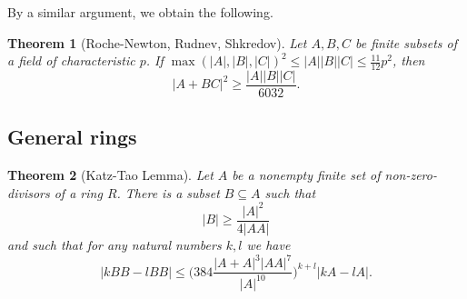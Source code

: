 \documentclass[letterpaper,11pt]{article}
\newtheorem{thm}{Theorem}
\theoremstyle{definition}
\theoremstyle{remark}
\begin{document}
By a similar argument, we obtain the following.

\begin{thm}[Roche-Newton, Rudnev, Shkredov] Let $A,B,C$ be finite subsets of a field of characteristic $p$. If $\max(|A|,|B|,|C|)^2 \le |A||B||C| \le \frac{11}{12}p^2$, then
\[
|A+BC|^2 \ge \frac{|A||B||C|}{6032}.
\]
\end{thm}

\subsection{General rings}

\begin{thm}[Katz-Tao Lemma] Let $A$ be a nonempty finite set of non-zero-divisors of a ring $R$. There is a subset $B \subseteq A$ such that
\[
|B| \ge \frac{|A|^2}{4|AA|}
\]
and such that for any natural numbers $k,l$ we have
\[
|kBB-lBB| \le \bigg(384\frac{|A+A|^3|AA|^7}{|A|^{10}}\bigg)^{k+l}|kA-lA|.
\]
\end{thm}
\end{document}

